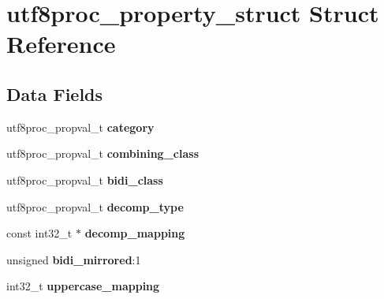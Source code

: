\hypertarget{structutf8proc__property__struct}{}\section{utf8proc\+\_\+property\+\_\+struct Struct Reference}
\label{structutf8proc__property__struct}
\subsection*{Data Fields}
\begin{DoxyCompactItemize}
\item 
\mbox{\label{structutf8proc__property__struct_aaf0c114f138f94f7b1b395f98bd3b56a}} 
utf8proc\+\_\+propval\+\_\+t {\bfseries category}
\item 
\mbox{\label{structutf8proc__property__struct_aba4ccae22f550c5aa43c3f87eadaf85f}} 
utf8proc\+\_\+propval\+\_\+t {\bfseries combining\+\_\+class}
\item 
\mbox{\label{structutf8proc__property__struct_abd1fde92128233b6dbfdeb70b92c80d9}} 
utf8proc\+\_\+propval\+\_\+t {\bfseries bidi\+\_\+class}
\item 
\mbox{\label{structutf8proc__property__struct_accca36acf0134cb64a257b2eba13fea0}} 
utf8proc\+\_\+propval\+\_\+t {\bfseries decomp\+\_\+type}
\item 
\mbox{\label{structutf8proc__property__struct_ac19f2c8b0e648f5031af0d0d8ed59ed7}} 
const int32\+\_\+t $\ast$ {\bfseries decomp\+\_\+mapping}
\item 
\mbox{\label{structutf8proc__property__struct_a698447a4e00828c5ce4d4f8e91017f30}} 
unsigned {\bfseries bidi\+\_\+mirrored}\+:1
\item 
\mbox{\label{structutf8proc__property__struct_ae4dd0cfacde5134b60ea51ef0d248167}} 
int32\+\_\+t {\bfseries uppercase\+\_\+mapping}
\item 
\mbox{\label{structutf8proc__property__struct_abf5a1605cb090fa226fccf23e081e59a}} 

\end{DoxyCompactItemize}

